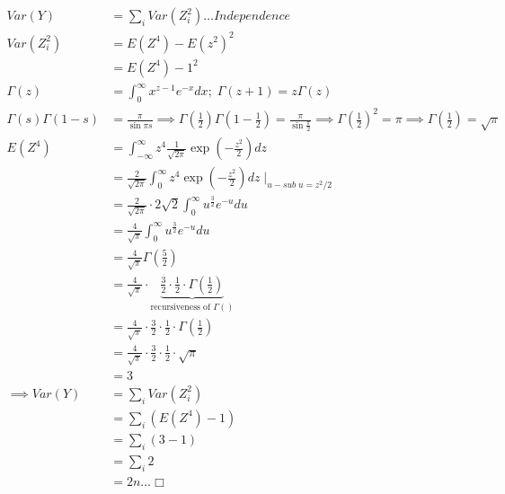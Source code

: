 \documentclass[
]{article}
\begin{document}
\[\begin{aligned}
Var(Y) &= \sum_i Var(Z_i^2) \dots Independence \\
Var(Z_i^2) &= E(Z^4) - E(z^2)^2 \\
&= E(Z^4) - 1^2 \\
\Gamma(z) &= \int^\infty_0x^{z-1}e^{-x}dx; \; \Gamma(z+1) = z\Gamma(z) \\
\Gamma(s)\Gamma(1-s) &= \frac{\pi}{\sin \pi s} 
\implies \Gamma(\frac{1}{2})\Gamma(1-\frac{1}{2}) = \frac{\pi}{\sin\frac{\pi}{2}} 
\implies \Gamma(\frac{1}{2})^2 = \pi 
\implies \Gamma(\frac{1}{2}) = \sqrt{\pi} \\
E(Z^4) &= \int _{-\infty}^{\infty}z^4 \frac{1}{\sqrt{2\pi}}\exp(-\frac{z^2}{2})dz \\
&= \frac{2}{\sqrt{2\pi}}\int _{0}^{\infty}z^4 \exp(-\frac{z^2}{2})dz \mid _{u-sub\; u = z^2/2} \\
&= \frac{2}{\sqrt{2\pi}}\cdot 2\sqrt{2}\int^\infty_0 u^{\frac{3}{2}}e^{-u}du \\
&= \frac{4}{\sqrt{\pi}}\int^\infty_0 u^{\frac{3}{2}}e^{-u}du \\
&= \frac{4}{\sqrt{\pi}}\Gamma(\frac{5}{2}) \\
&= \frac{4}{\sqrt{\pi}}\cdot\underbrace{\frac{3}{2}\cdot\frac{1}{2}\cdot\Gamma(\frac{1}{2})}_\text{recursiveness of \(\Gamma()\)} \\
&= \frac{4}{\sqrt{\pi}}\cdot\frac{3}{2}\cdot\frac{1}{2}\cdot\Gamma(\frac{1}{2})\\
&= \frac{4}{\sqrt{\pi}}\cdot\frac{3}{2}\cdot\frac{1}{2}\cdot\sqrt{\pi}\\
&= 3\\
\implies Var(Y) &= \sum_i Var(Z_i^2) \\
&= \sum_i \left( E(Z^4) - 1 \right) \\
&= \sum_i (3 - 1) \\
&= \sum_i 2 \\
&= 2n\dots \Box
\end{aligned}\]
\end{document}
